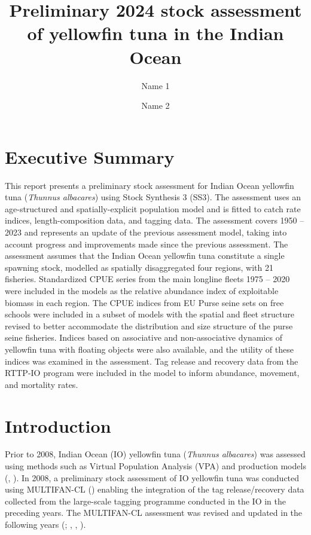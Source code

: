 \documentclass[
]{scrartcl}
\title{Preliminary 2024 stock assessment of yellowfin tuna in the Indian
Ocean}
\author[1,2]{Name 1}
\author[2]{Name 2}
\affil[1]{AZTI, Marine Research, Basque Research and Technology Alliance
(BRTA), Txatxarramendi ugartea z/g, 48395 Sukarrieta (Bizkaia), Spain}
\affil[2]{Affiliation 2}
\date{}
\renewcommand*\contentsname{Table of contents}
\newcommand\contentsname{Table of contents}
\begin{document}
\maketitle

\renewcommand*\contentsname{Contents}
{
\hypersetup{linkcolor=blue}
\setcounter{tocdepth}{3}
\tableofcontents
}
\newpage{}

\section*{Executive Summary}\label{executive-summary}

This report presents a preliminary stock assessment for Indian Ocean
yellowfin tuna (\emph{Thunnus albacares}) using Stock Synthesis 3 (SS3).
The assessment uses an age-structured and spatially-explicit population
model and is fitted to catch rate indices, length-composition data, and
tagging data. The assessment covers 1950 -- 2023 and represents an
update of the previous assessment model, taking into account progress
and improvements made since the previous assessment. The assessment
assumes that the Indian Ocean yellowfin tuna constitute a single
spawning stock, modelled as spatially disaggregated four regions, with
21 fisheries. Standardized CPUE series from the main longline fleets
1975 -- 2020 were included in the models as the relative abundance index
of exploitable biomass in each region. The CPUE indices from EU Purse
seine sets on free schools were included in a subset of models with the
spatial and fleet structure revised to better accommodate the
distribution and size structure of the purse seine fisheries. Indices
based on associative and non-associative dynamics of yellowfin tuna with
floating objects were also available, and the utility of these indices
was examined in the assessment. Tag release and recovery data from the
RTTP-IO program were included in the model to inform abundance,
movement, and mortality rates.

\newpage{}

\section{Introduction}\label{introduction}

Prior to 2008, Indian Ocean (IO) yellowfin tuna (\emph{Thunnus
albacares}) was assessed using methods such as Virtual Population
Analysis (VPA) and production models
(, ). In
2008, a preliminary stock assessment of IO yellowfin tuna was conducted
using MULTIFAN-CL
() enabling the integration of the tag release/recovery data
collected from the large-scale tagging programme conducted in the IO in
the preceding years. The MULTIFAN-CL assessment was revised and updated
in the following years
(; ,
,
).
\end{document}
